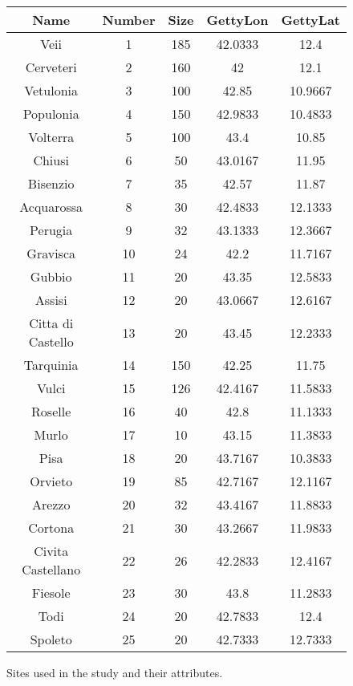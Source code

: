 \documentclass[12pt,a4paper]{thesis}
\begin{document}
\begin{figure}
\begin{tabular}{|c|c|c|c|c|}
\hline \textbf{Name} & \textbf{Number} & \textbf{Size} & \textbf{GettyLon} & \textbf{GettyLat} \\ 
\hline 	Veii	&	1	&	185	&	42.0333	&	12.4	\\
\hline 	Cerveteri	&	2	&	160	&	42	&	12.1	\\
\hline 	Vetulonia	&	3	&	100	&	42.85	&	10.9667	\\
\hline 	Populonia	&	4	&	150	&	42.9833	&	10.4833	\\
\hline 	Volterra	&	5	&	100	&	43.4	&	10.85	\\
\hline 	Chiusi	&	6	&	50	&	43.0167	&	11.95	\\
\hline 	Bisenzio	&	7	&	35	&	42.57	&	11.87	\\
\hline 	Acquarossa	&	8	&	30	&	42.4833	&	12.1333	\\
\hline 	Perugia	&	9	&	32	&	43.1333	&	12.3667	\\
\hline 	Gravisca	&	10	&	24	&	42.2	&	11.7167	\\
\hline 	Gubbio	&	11	&	20	&	43.35	&	12.5833	\\
\hline 	Assisi	&	12	&	20	&	43.0667	&	12.6167	\\
\hline 	Citta di Castello	&	13	&	20	&	43.45	&	12.2333	\\
\hline 	Tarquinia	&	14	&	150	&	42.25	&	11.75	\\
\hline 	Vulci	&	15	&	126	&	42.4167	&	11.5833	\\
\hline 	Roselle	&	16	&	40	&	42.8	&	11.1333	\\
\hline 	Murlo	&	17	&	10	&	43.15	&	11.3833	\\
\hline 	Pisa	&	18	&	20	&	43.7167	&	10.3833	\\
\hline 	Orvieto	&	19	&	85	&	42.7167	&	12.1167	\\
\hline 	Arezzo	&	20	&	32	&	43.4167	&	11.8833	\\
\hline 	Cortona	&	21	&	30	&	43.2667	&	11.9833	\\
\hline 	Civita Castellano	&	22	&	26	&	42.2833	&	12.4167	\\
\hline 	Fiesole	&	23	&	30	&	43.8	&	11.2833	\\
\hline 	Todi	&	24	&	20	&	42.7833	&	12.4	\\
\hline 	Spoleto	&	25	&	20	&	42.7333	&	12.7333	\\
\hline
\end{tabular} 
\caption{ Sites used in the study and their attributes.}
\label{fig:SiteData}
\end{figure}
\end{document}
